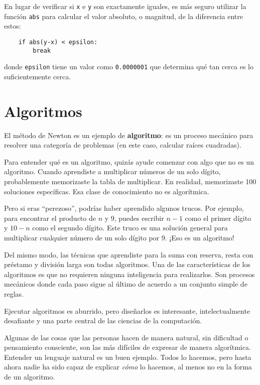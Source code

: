\documentclass[10pt]{book}
\begin{document}
En lugar de verificar si {\tt x} e {\tt y} son exactamente iguales, es
más seguro utilizar la función {\tt abs} para calcular el
valor absoluto, o magnitud, de la diferencia entre estos:

\begin{verbatim}
    if abs(y-x) < epsilon:
        break
\end{verbatim}
%
donde \verb"epsilon" tiene un valor como {\tt 0.0000001} que
determina qué tan cerca es lo suficientemente cerca.


\section{Algoritmos}

El método de Newton es un ejemplo de {\bf algoritmo}: es un
proceso mecánico para resolver una categoría de problemas (en este
caso, calcular raíces cuadradas).

Para entender qué es un algoritmo, quizás ayude comenzar con
algo que no es un algoritmo.  Cuando aprendiste a multiplicar
números de un solo dígito, probablemente memorizaste la tabla de multiplicar.
En realidad, memorizaste 100 soluciones específicas.  Esa clase de
conocimiento no es algorítmica.

Pero si eras ``perezoso'', podrías haber aprendido algunos
trucos.  Por ejemplo, para encontrar el producto de $n$ y 9, puedes
escribir $n-1$ como el primer dígito y $10-n$ como el segundo
dígito.  Este truco es una solución general para multiplicar cualquier
número de un solo dígito por 9.  ¡Eso es un algoritmo!

Del mismo modo, las técnicas que aprendiste para la suma con reserva,
resta con préstamo y división larga son todas algoritmos.  Una
de las características de los algoritmos es que no requieren ninguna
inteligencia para realizarlos.  Son procesos mecánicos donde
cada paso sigue al último de acuerdo a un conjunto simple de reglas.

Ejecutar algoritmos es aburrido, pero diseñarlos es interesante,
intelectualmente desafiante y una parte central de las ciencias de la computación.

Algunas de las cosas que las personas hacen de manera natural, sin dificultad o
pensamiento consciente, son las más difíciles de expresar de manera algorítmica.
Entender un lenguaje natural es un buen ejemplo.  Todos lo hacemos, pero
hasta ahora nadie ha sido capaz de explicar {\em cómo} lo hacemos, al menos
no en la forma de un algoritmo.
\end{document}
